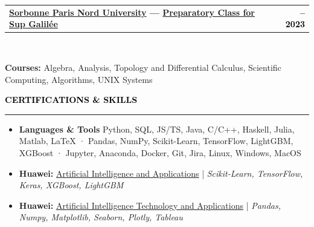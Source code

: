 \documentclass[10pt,english,french]{article}
\makeatletter
\newcommand{\certificateIcon}[1][black]{\textcolor{#1}{\faClipboard}}
\newlength{\mpwidth}
\newcommand{\cvsection}[1]{
    \vspace{4pt}
    \textbf{\fontsize{9pt}{10pt}\selectfont \textcolor{black}{#1}}
    \vspace{6pt}
    \hrule
    \vspace{6pt}
}
\newcommand{\cvtextnotab}[1]{
    \parbox{1\mpwidth}{#1}
}
\newcommand{\cvevent}[2]{
    \vspace{2pt}
    \parbox{\mpwidth}{
        \begin{tabular*}{1\mpwidth}{@{\extracolsep{\fill}} l r}
            \textcolor{black}{\textbf{\fontsize{11}{12}\selectfont #1}} & \textcolor{black}{\textbf{\fontsize{12}{12}\selectfont #2}} \\
        \end{tabular*}\\[-8pt] %
    }
}
\newcommand{\cvsubevent}[2]{
    \parbox{\mpwidth}{
        \begin{tabular*}{1\mpwidth}{@{\extracolsep{\fill}} l r}
            \textcolor{black}{\textit{\fontsize{10}{12}\selectfont #1}} & \textcolor{black}{\textit{\fontsize{10}{12}\selectfont #2}} \\
        \end{tabular*}\\[-8pt] %
    }
    \vspace{-10pt}
}
\makeatother
\begin{document}
\cvevent{\href{https://www.univ-spn.fr}{Sorbonne Paris Nord University} --- \href{https://www.sup-galilee.univ-paris13.fr/index.php/formation/cp2i/}{Preparatory Class for \textbf{Sup Galilée}}}{\fontsize{11pt}{11pt}\selectfont 2021\hspace{5pt}--\hspace{5pt}2023}

\vspace{-10pt}
\cvtextnotab{\textbf{Courses\!:} Algebra, Analysis, Topology and Differential Calculus, Scientific Computing, Algorithms, UNIX Systems}



\vspace{-14pt}
\cvsection{\certificateIcon[black]\hspace{4pt}CERTIFICATIONS \& SKILLS}

\vspace{-4pt}
\begin{itemize}[leftmargin=0.5cm, label=\textbullet, itemsep=0.2em]
    \item \textbf{Languages \& Tools} Python, SQL, JS/TS, Java, C/C++, Haskell, Julia, Matlab, LaTeX · Pandas, NumPy, Scikit-Learn, TensorFlow, LightGBM, XGBoost · Jupyter, Anaconda, Docker, Git, Jira, Linux, Windows, MacOS
    \item \textbf{Huawei:} \href{https://github.com/DmytroPalahin/cv-latex-simple-en/blob/main/docs/huawei_artificial_intelligence_and_applications.pdf}{Artificial Intelligence and Applications} | \textit{Scikit-Learn, TensorFlow, Keras, XGBoost, LightGBM}
    \item \textbf{Huawei:} \href{https://github.com/DmytroPalahin/cv-latex-simple-en/blob/main/docs/huawei_artificial_intelligence_technology_and_applications.pdf}{Artificial Intelligence Technology and Applications} | \textit{Pandas, Numpy, Matplotlib, Seaborn, Plotly, Tableau}
\end{itemize}
\end{document}
